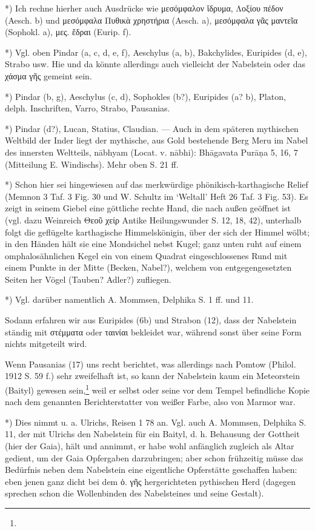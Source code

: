 \documentclass[a4paper, 11pt, oneside]{article}
\begin{document}
*) Ich rechne hierher auch Ausdrücke wie μεσόμφαλον ἵδρυμα, Λοξίου πέδον (Aesch. b) und μεσόμφαλα Πυθικὰ χρηστήρια (Aesch. a), μεσόμφαλα γᾶς μαντεῖα (Sophokl. a), μες. ἕδραι (Eurip. f).

*) Vgl. oben Pindar (a, c, d, e, f), Aeschylus (a, b), Bakchylides, Euripides (d, e), Strabo usw. Hie und da könnte allerdings auch vielleicht der Nabelstein oder das χάσμα γῆς gemeint sein.

*) Pindar (b, g), Aeschylus (c, d), Sophokles (b?), Euripides (a? b), Platon, delph. Inschriften, Varro, Strabo, Pausanias.

*) Pindar (d?), Lucan, Statius, Claudian. --- Auch in dem späteren mythischen Weltbild der Inder liegt der mythische, aus Gold bestehende Berg Meru im Nabel des innersten Weltteils, nābhyam (Locat. v. nābhi): Bhāgavata Purāṇa 5, 16, 7 (Mitteilung E. Windischs). Mehr oben S. 21 ff.

*) Schon hier sei hingewiesen auf das merkwürdige phönikisch-karthagische Relief (Memnon 3 Taf. 3 Fig. 30 und W. Schultz im `Weltall' Heft 26 Taf. 3 Fig. 53). Es zeigt in seinem Giebel eine göttliche rechte Hand, die nach außen geöffnet ist (vgl. dazu Weinreich Θεοῦ χείρ Antike Heilungswunder S. 12, 18, 42), unterhalb folgt die geflügelte karthagische Himmelskönigin, über der sich der Himmel wölbt; in den Händen hält sie eine Mondsichel nebst Kugel; ganz unten ruht auf einem omphalosähnlichen Kegel ein von einem Quadrat eingeschlossenes Rund mit einem Punkte in der Mitte (Becken, Nabel?), welchem von entgegengesetzten Seiten her Vögel (Tauben? Adler?) zufliegen.

*) Vgl. darüber namentlich A. Mommsen, Delphika S. 1 ff. und 11.

Sodann erfahren wir aus Euripides (6b) und Strabon (12), dass der Nabelstein ständig mit στέμματα oder ταινίαι bekleidet war, während sonst über seine Form nichts mitgeteilt wird.

Wenn Pausanias (17) uns recht berichtet, was allerdings nach Pomtow (Philol. 1912 S. 59 f.) sehr zweifelhaft ist, so kann der Nabelstein kaum ein Meteorstein (Baityl) gewesen sein,\footnote{} weil er selbst oder seine vor dem Tempel befindliche Kopie nach dem genannten Berichterstatter von weißer Farbe, also von Marmor war.

*) Dies nimmt u. a. Ulrichs, Reisen 1 78 an. Vgl. auch A. Mommsen, Delphika S. 11, der mit Ulrichs den Nabelstein für ein Baityl, d. h. Behausung der Gottheit (hier der Gaia), hält und annimmt, er habe wohl anfänglich zugleich als Altar gedient, um der Gaia Opfergaben darzubringen; aber schon frühzeitig müsse das Bedürfnis neben dem Nabelstein eine eigentliche Opferstätte geschaffen haben: eben jenen ganz dicht bei dem ὀ. γῆς hergerichteten pythischen Herd (dagegen sprechen schon die Wollenbinden des Nabelsteines und seine Gestalt).
\end{document}
